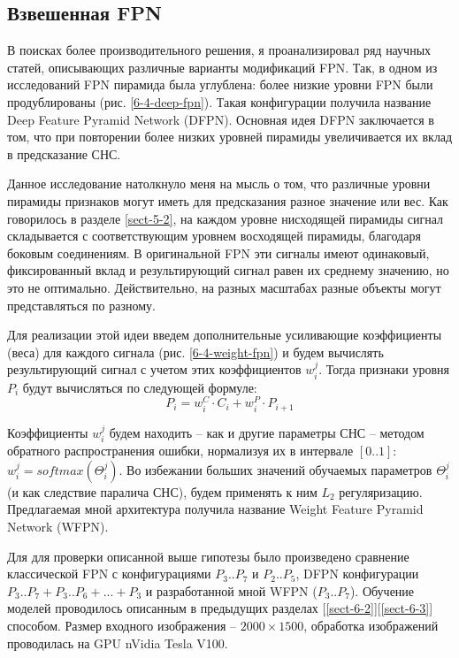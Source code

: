 \subsection{Взвешенная FPN} \label{sect-wfpn}

В поисках более производительного решения, я проанализировал ряд научных статей, описывающих различные варианты модификаций FPN. Так, в одном из исследований \cite{lib-dfpn} FPN пирамида была углублена: более низкие уровни FPN были продублированы (рис. \ref{6-4-deep-fpn}). Такая конфигурации получила название Deep Feature Pyramid Network (DFPN). Основная идея DFPN заключается в том, что при повторении более низких уровней пирамиды увеличивается их вклад в предсказание СНС.


Данное исследование натолкнуло меня на мысль о том, что различные уровни пирамиды признаков могут иметь для предсказания разное значение или вес. Как говорилось в разделе \ref{sect-5-2}, на каждом уровне нисходящей пирамиды сигнал складывается с соответствующим уровнем восходящей пирамиды, благодаря боковым соединениям. В оригинальной FPN эти сигналы имеют одинаковый, фиксированный вклад и результирующий сигнал равен их среднему значению, но это не оптимально. Действительно, на разных масштабах разные объекты могут представляться по разному. 

Для реализации этой идеи введем дополнительные усиливающие коэффициенты (веса) для каждого сигнала (рис. \ref{6-4-weight-fpn}) и будем вычислять результирующий сигнал с учетом этих коэффициентов $w^{j}_{i}$. Тогда признаки уровня $P_i$ будут вычисляться по следующей формуле:
$$
P_i = w^{C}_i \cdot C_i + w^{P}_i \cdot P_{i+1}
$$

Коэффициенты $w^{j}_{i}$ будем находить -- как и другие параметры СНС -- методом обратного распространения ошибки, нормализуя их в интервале $[0..1]$: $w^{j}_{i} = softmax(\Theta^{j}_{i})$. Во избежании больших значений обучаемых параметров $\Theta^{j}_{i}$ (и как следствие паралича СНС), будем применять к ним $L_2$ регуляризацию. Предлагаемая мной архитектура получила название Weight Feature Pyramid Network (WFPN).


Для для проверки описанной выше гипотезы было произведено сравнение классической FPN с конфигурациями $P_3..P_7$ и $P_2..P_5$, DFPN конфигурации $P_3..P_7 + P_3..P_6 + ... + P_3$ и разработанной мной WFPN ($P_3..P_7$). Обучение моделей проводилось описанным в предыдущих разделах [\ref{sect-6-2}][\ref{sect-6-3}] способом. Размер входного изображения -- $2000\times1500$, обработка изображений проводилась на GPU nVidia Tesla V100.

